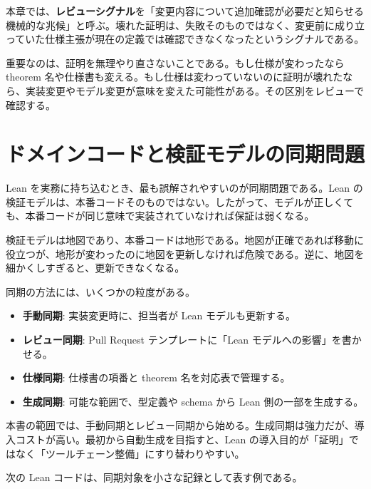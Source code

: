 \begin{definitionbox}
本章では、\textbf{レビューシグナル}を「変更内容について追加確認が必要だと知らせる機械的な兆候」と呼ぶ。壊れた証明は、失敗そのものではなく、変更前に成り立っていた仕様主張が現在の定義では確認できなくなったというシグナルである。
\end{definitionbox}

重要なのは、証明を無理やり直さないことである。もし仕様が変わったなら theorem 名や仕様書も変える。もし仕様は変わっていないのに証明が壊れたなら、実装変更やモデル変更が意味を変えた可能性がある。その区別をレビューで確認する。

\section{ドメインコードと検証モデルの同期問題}

Lean を実務に持ち込むとき、最も誤解されやすいのが同期問題である。Lean の検証モデルは、本番コードそのものではない。したがって、モデルが正しくても、本番コードが同じ意味で実装されていなければ保証は弱くなる。

\begin{intuitionbox}
検証モデルは地図であり、本番コードは地形である。地図が正確であれば移動に役立つが、地形が変わったのに地図を更新しなければ危険である。逆に、地図を細かくしすぎると、更新できなくなる。
\end{intuitionbox}

同期の方法には、いくつかの粒度がある。

\begin{itemize}
\item \textbf{手動同期}: 実装変更時に、担当者が Lean モデルも更新する。
\item \textbf{レビュー同期}: Pull Request テンプレートに「Lean モデルへの影響」を書かせる。
\item \textbf{仕様同期}: 仕様書の項番と theorem 名を対応表で管理する。
\item \textbf{生成同期}: 可能な範囲で、型定義や schema から Lean 側の一部を生成する。
\end{itemize}

本書の範囲では、手動同期とレビュー同期から始める。生成同期は強力だが、導入コストが高い。最初から自動生成を目指すと、Lean の導入目的が「証明」ではなく「ツールチェーン整備」にすり替わりやすい。

次の Lean コードは、同期対象を小さな記録として表す例である。

